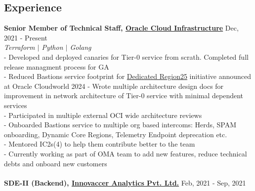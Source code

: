 \documentclass[margin, centered]{res}
\begin{document}
\begin{resume}
\section{Experience}
\textbf{Senior Member of Technical Staff, \href{https://www.oracle.com/cloud/}{Oracle Cloud Infrastructure}} \hfill Dec, 2021 - Present\\
\emph{\color{BlueViolet}Terraform $\vert$ Python $\vert$ Golang}\\ 
- Developed and deployed canaries for Tier-0 service from scrath. Completed full release managment process for GA\\
- Reduced Bastions service footprint for \href{https://www.cloud13.ch/2024/09/19/oracles-dedicated-region-just-got-smaller-meet-dedicated-region-25/}{Dedicated Region25} initiative announced at Oracle Cloudworld 2024
- Wrote multiple architecture design docs for improvement in network architecture of Tier-0 service with minimal dependent services \\
- Participated in multiple external OCI wide architecture reviews \\
- Onboarded Bastions service to multiple org based intercoms: Herds, SPAM onboarding, Dynamic Core Regions, Telemetry Endpoint deprecation etc. \\
- Mentored IC2s(4) to help them contribute better to the team \\
- Currently working as part of OMA team to add new features, reduce technical debts and onboard new customers \\
\\
\textbf{SDE-II (Backend), \href{https://testbook.com}{Innovaccer Analytics Pvt. Ltd.}} \hfill Feb, 2021 - Sep, 2021\\

\end{resume}
\end{document}

